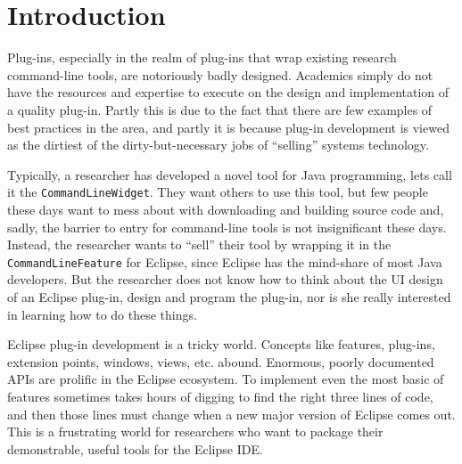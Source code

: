 \documentclass[conference]{IEEEtran}
\newcommand{\etc}{etc.\xspace}
\begin{document}

%
\IEEEpeerreviewmaketitle


\section{Introduction}
\label{sec:introduction}

Plug-ins, especially in the realm of plug-ins that wrap existing
research command-line tools, are notoriously badly designed.
Academics simply do not have the resources and expertise to execute on
the design and implementation of a quality plug-in.  Partly this is due
to the fact that there are few examples of best practices in the area,
and partly it is because plug-in development is viewed as the dirtiest
of the dirty-but-necessary jobs of ``selling'' systems technology.

Typically, a researcher has developed a novel tool for Java
programming, lets call it the \texttt{CommandLineWidget}.  They want
others to use this tool, but few people these days want to mess about
with downloading and building source code and, sadly, the barrier to
entry for command-line tools is not insignificant these days.
Instead, the researcher wants to ``sell'' their tool by wrapping it in
the \texttt{CommandLineFeature} for Eclipse, since Eclipse has the
mind-share of most Java developers.  But the researcher does not know
how to think about the UI design of an Eclipse plug-in, design and
program the plug-in, nor is she really interested in learning how to
do these things.

Eclipse plug-in development is a tricky world.  Concepts like
features, plug-ins, extension points, windows, views, \etc abound.
Enormous, poorly documented APIs are prolific in the Eclipse
ecosystem.  To implement even the most basic of features sometimes
takes hours of digging to find the right three lines of code, and then
those lines must change when a new major version of Eclipse comes out.
This is a frustrating world for researchers who want to package their
demonstrable, useful tools for the Eclipse IDE.
\end{document}
